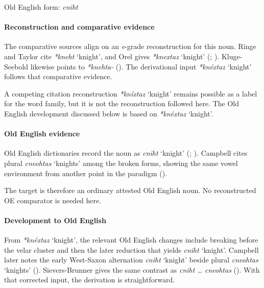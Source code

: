 \documentclass[
  british,
  a4paper,
]{article}
\providecommand{\Recon}[1]{\emph{*#1}}
\begin{document}
Old English form: \emph{cniht}

\paragraph{Reconstruction and comparative
evidence}\label{reconstruction-and-comparative-evidence-99}

The comparative sources align on an \emph{e}-grade reconstruction for
this noun. Ringe and Taylor cite \Recon{kneht} `knight', and Orel gives
\Recon{knextaz} `knight' (; ).
Kluge-Seebold likewise points to \emph{*knehta-}
(). The derivational
input \Recon{knéxtaz} `knight' follows that comparative evidence.

A competing citation reconstruction \Recon{kníxtaz} `knight' remains
possible as a label for the word family, but it is not the
reconstruction followed here. The Old English development discussed
below is based on \Recon{knéxtaz} `knight'.

\paragraph{Old English evidence}\label{old-english-evidence-101}

Old English dictionaries record the noun as {\emph{cniht}} `knight'
(;
).
Campbell cites plural {\emph{cneohtas}} `knights' among the broken
forms, showing the same vowel environment from another point in the
paradigm ().

The target is therefore an ordinary attested Old English noun. No
reconstructed OE comparator is needed here.

\paragraph{Development to Old
English}\label{development-to-old-english-99}

From \Recon{knéxtaz} `knight', the relevant Old English changes include
breaking before the velar cluster and then the later reduction that
yields {\emph{cniht}} `knight'. Campbell later notes the early
West-Saxon alternation {\emph{cniht}} `knight' beside plural
{\emph{cneohtas}} `knights' (). Sievers-Brunner gives the same contrast as \emph{cniht
\ldots{} cneohtas} (). With that corrected input, the derivation is
straightforward.
\end{document}
